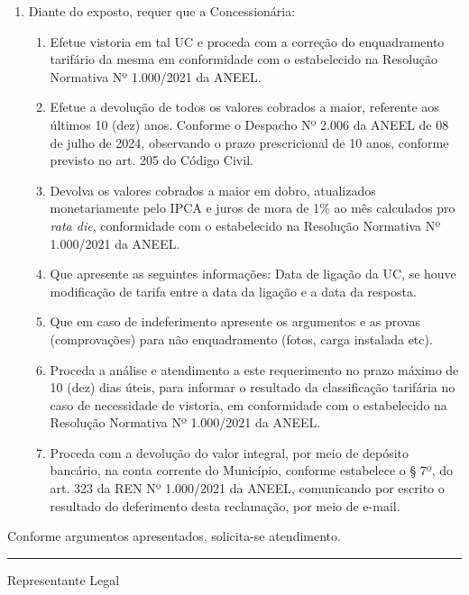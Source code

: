\documentclass[11pt,a4paper]{article}
\begin{document}
\begin{enumerate}[resume]
\item 
Diante do exposto, requer que a Concessionária:

\begin{enumerate}
\item 
Efetue vistoria em tal UC e proceda com a correção do enquadramento tarifário da mesma em conformidade com o estabelecido na Resolução Normativa Nº 1.000/2021 da ANEEL.
\item 
Efetue a devolução de todos os valores cobrados a maior, referente aos últimos 10 (dez) anos. Conforme o Despacho Nº 2.006 da ANEEL de 08 de julho de 2024, observando o prazo prescricional de 10 anos, conforme previsto no art. 205 do Código Civil.
\item 
Devolva os valores cobrados a maior em dobro, atualizados monetariamente pelo IPCA e juros de mora de 1\% ao mês calculados pro \textit{rata die}, conformidade com o estabelecido na Resolução Normativa Nº 1.000/2021 da ANEEL.   
\item 
Que apresente as seguintes informações: Data de ligação da UC, se houve modificação de tarifa entre a data da ligação e a data da resposta.   
\item 
Que em caso de indeferimento apresente os argumentos e as provas (comprovações) para não enquadramento (fotos, carga instalada etc).   
\item 
Proceda a análise e atendimento a este requerimento no prazo máximo de 10 (dez) dias úteis, para informar o resultado da classificação tarifária no caso de necessidade de vistoria, em conformidade com o estabelecido na Resolução Normativa Nº 1.000/2021 da ANEEL.  
\item 
Proceda com a devolução do valor integral, por meio de depósito bancário, na conta corrente do Município, conforme estabelece o § 7º, do art. 323 da REN Nº 1.000/2021 da ANEEL, comunicando por escrito o resultado do deferimento desta reclamação, por meio de e-mail.

\end{enumerate}
\end{enumerate}

Conforme argumentos apresentados, solicita-se atendimento.

\vspace{2cm}
\begin{center}
\noindent\rule{6cm}{0.4pt}

{\small Representante Legal}
\end{center}
\end{document}
